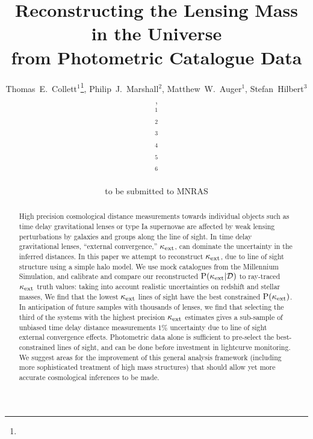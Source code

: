 \documentclass[useAMS,usenatbib,a4paper]{mn2e}
\title[Line of Sight Mass Reconstruction]
{Reconstructing the Lensing Mass in the Universe \\
from Photometric Catalogue Data}
\author[Collett \etal]{%
  Thomas~E.~Collett$^{1}$\thanks{\collettemail},
  Philip~J.~Marshall$^{2}$,
  Matthew~W.~Auger$^{1}$,
  Stefan~Hilbert$^{3}$,
\newauthor{%
  Sherry~H.~Suyu$^{3,4}$,
  Zachary~Greene$^{4}$,
  Tommaso~Treu$^{4}$\thanks{\packard},
  Christopher~D.~Fassnacht$^{5}$,}
\newauthor{%
  L\'eon~V.~E.~Koopmans$^{6}$,
  Maru\v{s}a Brada\v{c}$^{5}$,
  Roger~D.~Blandford$^{3}$} 
  \medskip\\
  $^1$\ioa\\
  $^2$\oxford\\
  $^3$\kipac\\
  $^4$\ucsb\\
  $^5$\davis\\
  $^6$\kapteyn
}
\begin{document}
             
\date{to be submitted to MNRAS}
\pagerange{\pageref{firstpage}--\pageref{lastpage}}

\maketitle           

\label{firstpage}


\begin{abstract} 

High precision cosmological distance measurements towards individual objects
such as time delay gravitational lenses or type Ia supernovae are affected by
weak lensing perturbations by galaxies and groups along the line of sight. In
time delay gravitational lenses, ``external convergence,'' $\kappa_{\rm ext}$, can
dominate the uncertainty in the inferred distances. In this paper we attempt
to reconstruct $\kappa_{\rm ext}$, due to line of sight structure using a simple halo
model.
%
We use mock catalogues from the Millennium Simulation, and calibrate and 
compare our reconstructed ${\rm P}(\kappa_{\rm ext}|{\mathcal{D}})$ to ray-traced $\kappa_{\rm ext}$ truth
values:  taking into account realistic uncertainties on redshift and stellar
masses,  
%
We find that the lowest $\kappa_{\rm ext}$ lines of sight have the best constrained 
${\rm P}(\kappa_{\rm ext})$. In anticipation of future samples with thousands of lenses,
we find that selecting the third of the systems with the
highest precision $\kappa_{\rm ext}$ estimates gives a  sub-sample of unbiased time
delay distance measurements  1\% uncertainty due
to line of sight external convergence effects. Photometric data alone is
sufficient to pre-select the best-constrained lines of sight, and can be done
before investment in lightcurve monitoring. 
%
  We suggest areas for the
improvement of this general analysis framework (including more sophisticated
treatment of high mass structures) that should allow yet more accurate
cosmological inferences to be made.

\end{abstract}

\end{document}
